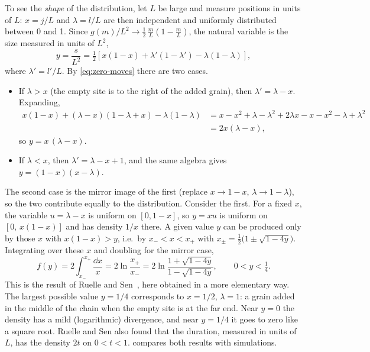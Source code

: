 To see the \emph{shape} of the distribution, let $L$ be large and measure positions in units of $L$: $x = j/L$ and
$\lambda = l/L$ are then independent and uniformly distributed between 0 and 1. Since $g(m)/L^2\to\tfrac12\,\tfrac mL(1-\tfrac mL)$,
the natural variable is the size measured in units of $L^2$,
\begin{equation}
  y = \frac{s}{L^2} = \tfrac12\left[x(1-x) + \lambda'(1-\lambda') - \lambda(1-\lambda)\right],
\end{equation}
where $\lambda' = l'/L$. By \cref{eq:zero-moves} there are two cases.
\begin{itemize}
  \item If $\lambda > x$ (the empty site is to the right of the added grain), then $\lambda' = \lambda - x$. Expanding,
    \begin{align*}
      x(1-x) + (\lambda-x)(1-\lambda+x) - \lambda(1-\lambda)
      &= x - x^2 + \lambda - \lambda^2 + 2\lambda x - x - x^2 - \lambda + \lambda^2 \\
      &= 2x(\lambda - x),
    \end{align*}
    so $y = x\,(\lambda-x)$.
  \item If $\lambda < x$, then $\lambda' = \lambda - x + 1$, and the same algebra gives $y = (1-x)(x-\lambda)$.
\end{itemize}
The second case is the mirror image of the first (replace $x\to1-x$, $\lambda\to1-\lambda$), so the two contribute equally to the
distribution. Consider the first. For a fixed $x$, the variable $u = \lambda - x$ is uniform on $[0,1-x]$, so $y = xu$ is uniform on
$[0,\,x(1-x)]$ and has density $1/x$ there. A given value $y$ can be produced only by those $x$ with $x(1-x)>y$, i.e.\ by
$x_-<x<x_+$ with $x_\pm = \tfrac12\bigl(1\pm\sqrt{1-4y}\bigr)$. Integrating over these $x$ and doubling for the mirror case,
\begin{equation}
  \boxed{\; f(y) = 2\int_{x_-}^{x_+}\frac{\dd x}{x} = 2\ln\frac{x_+}{x_-} = 2\ln\frac{1+\sqrt{1-4y}}{1-\sqrt{1-4y}},\qquad 0<y<\tfrac14. \;}
  \label{eq:fy}
\end{equation}
This is the result of Ruelle and Sen~\cite{RuelleSen1992}, here obtained in a more elementary way. The largest possible value $y=1/4$
corresponds to $x = 1/2$, $\lambda=1$: a grain added in the middle of the chain when the empty site is at the far end. Near $y=0$ the
density has a mild (logarithmic) divergence, and near $y = 1/4$ it goes to zero like a square root. Ruelle and Sen also found that the
duration, measured in units of $L$, has the density $2t$ on $0<t<1$.  compares both results with simulations.

